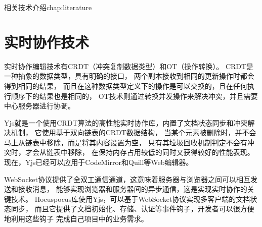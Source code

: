 \begin{cuzchapter}{相关技术介绍}{chap:literature}
	\section{实时协作技术}\label{sec:collaboration-tech}


	实时协作编辑技术有CRDT（冲突复制数据类型）和OT（操作转换）。
	CRDT是一种抽象的数据类型，具有明确的接口，
	两个副本接收到相同的更新操作时都会得到相同的结果，
	而且在这种数据类型定义下的操作是可以交换的，且在任何执行顺序下的结果也是相同的\cite{preguicca2018conflict}，
	OT技术则通过转换并发操作来解决冲突，并且需要中心服务器进行协调\cite{takeichi2024coordination}。

	Yjs就是一个使用CRDT算法的高性能实时协作库，内置了文档状态同步和冲突解决机制，
	它使用基于双向链表的CRDT数据结构，
	当某个元素被删除时，并不会马上从链表中移除，而是将其内容设置为空，
	只有其垃圾回收机制判定不会有冲突时，才会从链表中移除，
	在保持内存占用较低的同时又获得较好的性能表现\cite{nicolaescu2015yjs}。
	现在，Yjs已经可以应用于CodeMirror和Quill等Web编辑器。


	WebSocket协议提供了全双工通信通道，这意味着服务器与浏览器之间可以相互发送和接收消息，
	能够实现浏览器和服务器间的异步通信\cite{1024463893.nh,zhou2019websocket}，这是实现实时协作的关键技术。
	Hocuspocus库使用Yjs，可以基于WebSocket协议实现多客户端的文档状态同步，
	而且它提供了文档初始化、存储、认证等事件钩子，开发者可以很方便地利用这些钩子
	完成自己项目中的业务需求。


\end{cuzchapter}
